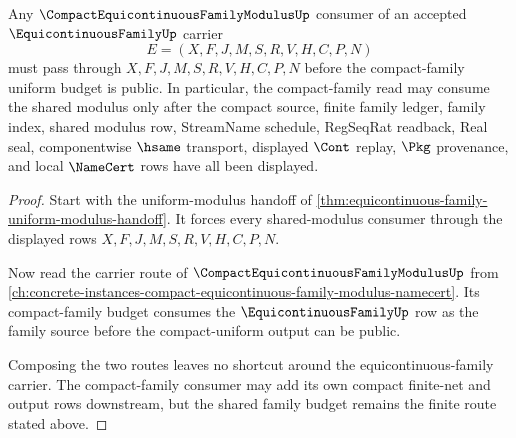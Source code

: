 \begin{theorem}
\label{thm:equicontinuous-family-compact-uniform-modulus-handoff}
Any $\CompactEquicontinuousFamilyModulusUp$ consumer of an accepted $\EquicontinuousFamilyUp$ carrier
$$
E=(X,F,J,M,S,R,V,H,C,P,N)
$$
must pass through $X,F,J,M,S,R,V,H,C,P,N$ before the compact-family uniform budget is public. In particular, the compact-family read may consume the shared modulus only after the compact source, finite family ledger, family index, shared modulus row, StreamName schedule, RegSeqRat readback, Real seal, componentwise $\hsame$ transport, displayed $\Cont$ replay, $\Pkg$ provenance, and local $\NameCert$ rows have all been displayed.
\end{theorem}
\begin{proof}
Start with the uniform-modulus handoff of \autoref{thm:equicontinuous-family-uniform-modulus-handoff}. It forces every shared-modulus consumer through the displayed rows $X,F,J,M,S,R,V,H,C,P,N$.

Now read the carrier route of $\CompactEquicontinuousFamilyModulusUp$ from \autoref{ch:concrete-instances-compact-equicontinuous-family-modulus-namecert}. Its compact-family budget consumes the $\EquicontinuousFamilyUp$ row as the family source before the compact-uniform output can be public.

Composing the two routes leaves no shortcut around the equicontinuous-family carrier. The compact-family consumer may add its own compact finite-net and output rows downstream, but the shared family budget remains the finite route stated above.
\end{proof}


\begin{closurestatus}{\EquicontinuousFamilyUp}
  \theoryclosure{\seedClosure}
  \formalstatus{\theoremCheckedV}
\end{closurestatus}
